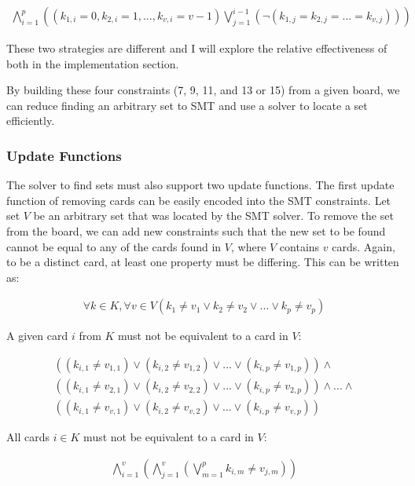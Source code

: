 \documentclass[pageno]{jpaper}
\begin{document}
\begin{align}
	\bigwedge \limits_{i=1}^{p}   \left(  (k_{1,i} = 0, k_{2,i} =1,  ... , k_{v,i} = v-1) \bigvee \limits_{j=1}^{i-1}  \left( \neg (k_{1,j} = k_{2,j} = ... = k_{v,j})  \right)   \right)
\end{align}

These two strategies are different and I will explore the relative effectiveness of both in the implementation section.

By building these four constraints (7, 9, 11, and 13 or 15) from a given board, we can reduce finding an arbitrary set to SMT and use a solver to locate a set efficiently. 

\subsubsection{Update Functions} 
The solver to find sets must also support two update functions. The first update function of removing cards can be easily encoded into the SMT constraints. Let set $V$ be an arbitrary set that was located by the SMT solver. To remove the set from the board, we can add new constraints such that the new set to be found cannot be equal to any of the cards found in $V$, where $V$ contains $v$ cards. Again, to be a distinct card, at least one property must be differing. This can be written as:

\begin{align}
	\forall k \in K, \forall v \in V \left (k_1 \neq v_1 \vee k_2 \neq v_2 \vee ... \vee k_p \neq v_p \right)
\end{align}

A given card $i$ from $K$ must not be equivalent to a card in $V$:

\begin{multline}
	((k_{i,1} \neq v_{1,1}) \vee (k_{i,2} \neq v_{1,2}) \vee ... \vee (k_{i,p} \neq v_{1,p})) \wedge \\
	 ((k_{i,1} \neq v_{2,1}) \vee (k_{i,2} \neq v_{2,2}) \vee ... \vee (k_{i,p} \neq v_{2,p}))  \wedge ... \wedge \\ ((k_{i,1} \neq v_{v,1}) \vee (k_{i,2} \neq v_{v,2}) \vee ... \vee (k_{i,p} \neq v_{v,p})) 
\end{multline}

All cards $i \in K$ must not be equivalent to a card in $V$:

\begin{align}
	\bigwedge \limits_{i=1}^{v}   \left( \bigwedge \limits_{j=1}^{v}  \left( \bigvee \limits_{m = 1}^{p} k_{i,m} \neq v_{j,m} \right)   \right)
\end{align}
\end{document}
